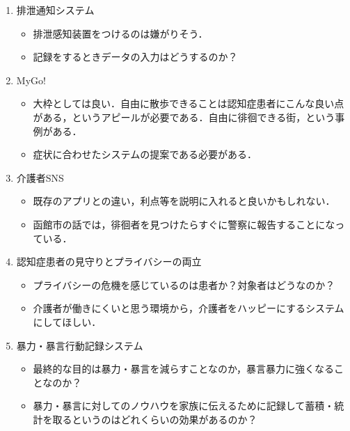 \documentclass[../report]{subfiles}
\begin{document}
\begin{enumerate}
    \item 排泄通知システム
        \begin{itemize}
            \item 排泄感知装置をつけるのは嫌がりそう．
            \item 記録をするときデータの入力はどうするのか？
        \end{itemize}
    \item MyGo!
        \begin{itemize}
            \item 大枠としては良い．自由に散歩できることは認知症患者にこんな良い点がある，というアピールが必要である．自由に徘徊できる街，という事例がある\cite{haikai}．
            \item 症状に合わせたシステムの提案である必要がある．
        \end{itemize}
    \item 介護者SNS
        \begin{itemize}
            \item 既存のアプリとの違い，利点等を説明に入れると良いかもしれない．
            \item 函館市の話では，徘徊者を見つけたらすぐに警察に報告することになっている．
        \end{itemize}
    \item 認知症患者の見守りとプライバシーの両立
        \begin{itemize}
            \item プライバシーの危機を感じているのは患者か？対象者はどうなのか？
            \item 介護者が働きにくいと思う環境から，介護者をハッピーにするシステムにしてほしい．
        \end{itemize}
    \item 暴力・暴言行動記録システム
        \begin{itemize}
            \item 最終的な目的は暴力・暴言を減らすことなのか，暴言暴力に強くなることなのか？
            \item 暴力・暴言に対してのノウハウを家族に伝えるために記録して蓄積・統計を取るというのはどれくらいの効果があるのか？
        \end{itemize}
\end{enumerate}
\end{document}
